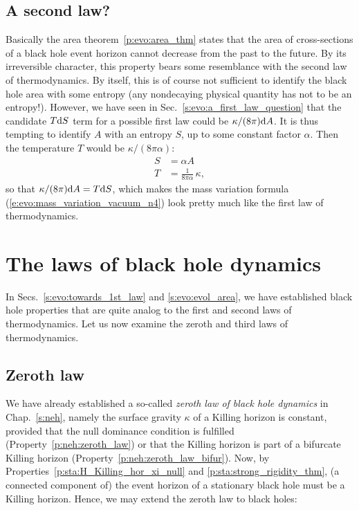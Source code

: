 \subsection{A second law?}

Basically the area theorem~\ref{p:evo:area_thm} states that
the area of cross-sections of a black hole event horizon
cannot decrease from the past to the future.
By its irreversible character, this property bears some resemblance
with the second law of thermodynamics.
By itself, this is of course not sufficient to identify the black hole area
with some entropy (any nondecaying physical quantity has not to be an entropy!).
However, we have seen in Sec.~\ref{s:evo:a_first_law_question} that the
candidate $T\mathrm{d} S$ term for a possible first law could be $\kappa/(8\pi)\mathrm{d} A$.
It is thus tempting to identify $A$ with an entropy $S$, up to some
constant factor $\alpha$. Then the temperature $T$ would be $\kappa/(8\pi\alpha)$:
\begin{subequations}
\label{e:evo:identif_S_T}
\begin{align}
  S & = \alpha A \label{e:evo:identif_S_A}\\
  T &= \frac{1}{8 \pi\alpha}\, \kappa , \label{e:evo:identif_T_kappa}
\end{align}
\end{subequations}
so that $\kappa/(8\pi)\mathrm{d} A = T\mathrm{d} S$, which makes
the mass variation formula (\ref{e:evo:mass_variation_vacuum_n4}) look pretty much like
the first law of thermodynamics.


\section{The laws of black hole dynamics}

In Secs.~\ref{s:evo:towards_1st_law} and \ref{s:evo:evol_area}, we have established black hole
properties that are quite analog to the first and second laws of thermodynamics. Let us now
examine the zeroth and third laws of thermodynamics.

\subsection{Zeroth law}

We have already established a so-called \emph{zeroth law of black hole dynamics}
in Chap.~\ref{s:neh}, namely the surface gravity
$\kappa$ of a Killing horizon is constant, provided that the
null dominance condition is fulfilled (Property~\ref{p:neh:zeroth_law})
or that the Killing horizon is part of a bifurcate Killing horizon
(Property~\ref{p:neh:zeroth_law_bifur}).
Now, by Properties~\ref{p:sta:H_Killing_hor_xi_null}
and \ref{p:sta:strong_rigidity_thm}, (a connected component of) the event horizon
of a stationary black hole must be a Killing horizon. Hence, we may extend
the zeroth law to black holes:

